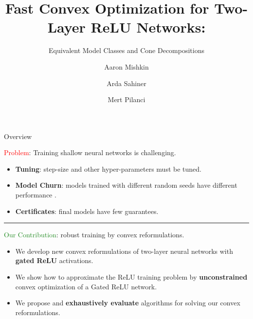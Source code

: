 \documentclass[usenames,dvipsnames,mathserif,notheorems]{beamer}
\title{Fast Convex Optimization for Two-Layer ReLU Networks:}
\subtitle{Equivalent Model Classes and Cone Decompositions}
\author{Aaron Mishkin \and Arda Sahiner \and Mert Pilanci}
\date{}
\newcommand{\centerrule}{
	{
	\vspace{-0.5em}
	\center \rule{\textwidth}{0.1em}
	\vspace{-0.2em}
	}
}
\begin{document}
\maketitle

\begin{frame}{Overview}

	{
		\large \textcolor{red}{Problem}: Training shallow neural networks is challenging.
	}
	\vspace{0.5em}

	\pause
	\begin{itemize}
		\item \textbf{Tuning}: step-size and other hyper-parameters must be tuned.
		      \pause
		\item \textbf{Model Churn}: models trained with different random seeds
		      have different performance \citep{henderson2018deep}.
		      \pause
		\item \textbf{Certificates}: final models have few guarantees.
	\end{itemize}

	\pause

	\centerrule
	{
		\large \textcolor{ForestGreen}{Our Contribution}: robust training by convex reformulations.
	}
	\vspace{0.5em}
	\pause
	\begin{itemize}
		\item We develop new convex reformulations of two-layer neural networks
		      with \textbf{gated ReLU} activations.
		      \pause
		\item We show how to approximate the ReLU training problem by \textbf{unconstrained}
		      convex optimization of a Gated ReLU network.
		      \pause
		\item We propose and \textbf{exhaustively evaluate} algorithms for solving
		      our convex reformulations.
	\end{itemize}

\end{frame}
\end{document}
